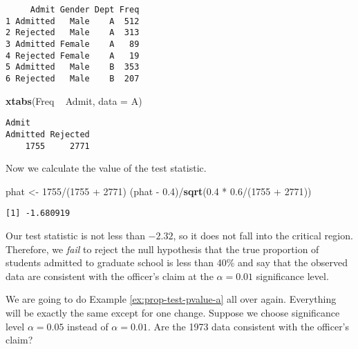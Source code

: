 \documentclass[]{book}
\newenvironment{Shaded}{\begin{snugshade}}{\end{snugshade}}
\newcommand{\KeywordTok}[1]{\textcolor[rgb]{0.13,0.29,0.53}{\textbf{{#1}}}}
\newcommand{\DataTypeTok}[1]{\textcolor[rgb]{0.13,0.29,0.53}{{#1}}}
\newcommand{\DecValTok}[1]{\textcolor[rgb]{0.00,0.00,0.81}{{#1}}}
\newcommand{\FloatTok}[1]{\textcolor[rgb]{0.00,0.00,0.81}{{#1}}}
\newcommand{\StringTok}[1]{\textcolor[rgb]{0.31,0.60,0.02}{{#1}}}
\newcommand{\NormalTok}[1]{{#1}}
\numberwithin{equation}{chapter}
\numberwithin{figure}{chapter}
\theoremstyle{plain}
\theoremstyle{definition}
\theoremstyle{remark}
\theoremstyle{definition}
\theoremstyle{definition}
\theoremstyle{remark}
\let\BeginKnitrBlock\begin \let\EndKnitrBlock\end
\begin{document}
\begin{verbatim}
     Admit Gender Dept Freq
1 Admitted   Male    A  512
2 Rejected   Male    A  313
3 Admitted Female    A   89
4 Rejected Female    A   19
5 Admitted   Male    B  353
6 Rejected   Male    B  207
\end{verbatim}

\begin{Shaded}
\begin{Highlighting}[]
\KeywordTok{xtabs}\NormalTok{(Freq ~}\StringTok{ }\NormalTok{Admit, }\DataTypeTok{data =} \NormalTok{A)}
\end{Highlighting}
\end{Shaded}

\begin{verbatim}
Admit
Admitted Rejected 
    1755     2771 
\end{verbatim}

Now we calculate the value of the test statistic.

\begin{Shaded}
\begin{Highlighting}[]
\NormalTok{phat <-}\StringTok{ }\DecValTok{1755}\NormalTok{/(}\DecValTok{1755} \NormalTok{+}\StringTok{ }\DecValTok{2771}\NormalTok{)}
\NormalTok{(phat -}\StringTok{ }\FloatTok{0.4}\NormalTok{)/}\KeywordTok{sqrt}\NormalTok{(}\FloatTok{0.4} \NormalTok{*}\StringTok{ }\FloatTok{0.6}\NormalTok{/(}\DecValTok{1755} \NormalTok{+}\StringTok{ }\DecValTok{2771}\NormalTok{)) }
\end{Highlighting}
\end{Shaded}

\begin{verbatim}
[1] -1.680919
\end{verbatim}

Our test statistic is not less than \(-2.32\), so it does not fall into
the critical region. Therefore, we \emph{fail} to reject the null
hypothesis that the true proportion of students admitted to graduate
school is less than 40\% and say that the observed data are consistent
with the officer's claim at the \(\alpha = 0.01\) significance level.

\bigskip

\BeginKnitrBlock{example}
\protect\hypertarget{ex:prop-test-pvalue-b}{}{\label{ex:prop-test-pvalue-b}}We
are going to do Example \ref{ex:prop-test-pvalue-a} all over again.
Everything will be exactly the same except for one change. Suppose we
choose significance level \(\alpha = 0.05\) instead of
\(\alpha = 0.01\). Are the 1973 data consistent with the officer's
claim?
\EndKnitrBlock{example}
\end{document}
